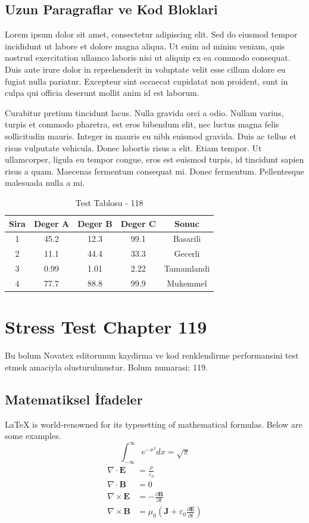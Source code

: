 \documentclass[12pt,a4paper]{article}
\begin{document}
\subsection{Uzun Paragraflar ve Kod Bloklari}
Lorem ipsum dolor sit amet, consectetur adipiscing elit. Sed do eiusmod tempor incididunt ut labore et dolore magna aliqua. Ut enim ad minim veniam, quis nostrud exercitation ullamco laboris nisi ut aliquip ex ea commodo consequat. Duis aute irure dolor in reprehenderit in voluptate velit esse cillum dolore eu fugiat nulla pariatur. Excepteur sint occaecat cupidatat non proident, sunt in culpa qui officia deserunt mollit anim id est laborum.

Curabitur pretium tincidunt lacus. Nulla gravida orci a odio. Nullam varius, turpis et commodo pharetra, est eros bibendum elit, nec luctus magna felis sollicitudin mauris. Integer in mauris eu nibh euismod gravida. Duis ac tellus et risus vulputate vehicula. Donec lobortis risus a elit. Etiam tempor. Ut ullamcorper, ligula eu tempor congue, eros est euismod turpis, id tincidunt sapien risus a quam. Maecenas fermentum consequat mi. Donec fermentum. Pellentesque malesuada nulla a mi.

\begin{table}[h!]
\centering
\begin{tabular}{|c|c|c|c|c|}
\hline
\textbf{Sira} & \textbf{Deger A} & \textbf{Deger B} & \textbf{Deger C} & \textbf{Sonuc} \\
\hline
1 & 45.2 & 12.3 & 99.1 & Basarili \\
2 & 11.1 & 44.4 & 33.3 & Gecerli \\
3 & 0.99 & 1.01 & 2.22 & Tamamlandi \\
4 & 77.7 & 88.8 & 99.9 & Mukemmel \\
\hline
\end{tabular}
\caption{Test Tablosu - 118}
\end{table}

\newpage
\section{Stress Test Chapter 119}
Bu bolum Novatex editorunun kaydirma ve kod renklendirme performansini test etmek amaciyla olusturulmustur. Bolum numarasi: 119.

\subsection{Matematiksel İfadeler}
\LaTeX{} is world-renowned for its typesetting of mathematical formulas. Below are some examples.
\begin{equation}
\int_{-\infty}^{\infty} e^{-x^2} dx = \sqrt{\pi}
\end{equation}
\begin{align}
\nabla \cdot \mathbf{E} &= \frac{\rho}{\varepsilon_0} \\
\nabla \cdot \mathbf{B} &= 0 \\
\nabla \times \mathbf{E} &= -\frac{\partial \mathbf{B}}{\partial t} \\
\nabla \times \mathbf{B} &= \mu_0\left(\mathbf{J} + \varepsilon_0 \frac{\partial \mathbf{E}}{\partial t}\right)
\end{align}
\end{document}
